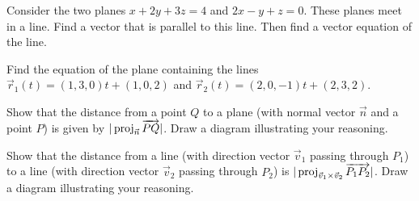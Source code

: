 \begin{problem}  %
Consider the two planes $x+2y+3z=4$ and $2x-y+z=0$.  These planes meet in a line.  Find a vector that is parallel to this line.  Then find a vector equation of the line.
\end{problem}

\begin{problem}\label{plane equation 2 lines}%
  Find the equation of the plane containing the lines $\vec r_1(t)=(1,3,0)t+(1,0,2)$ and $\vec r_2(t)=(2,0,-1)t+(2,3,2)$.
\end{problem}

\begin{problem}
  Show that the distance from a point $Q$ to a plane (with normal vector {$\vec n$} and a point $P$) is given by $|\operatorname{proj}_{\vec n}\overrightarrow {PQ}|$. Draw a diagram illustrating your reasoning.
\end{problem}

\begin{problem}
  Show that the distance from a line (with direction vector $\vec v_1$ passing through $P_1$) to a line (with direction vector $\vec v_2$ passing through $P_2$) is $|\operatorname{proj}_{\vec v_1\times\vec v_2}\overrightarrow {P_1P_2}|$. Draw a diagram illustrating your reasoning.
\end{problem}


